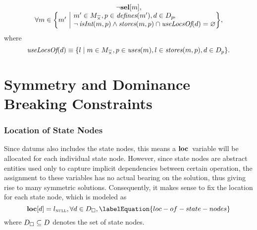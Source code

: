 \begin{equation}
  \begin{array}{c}
    \neg\mVar{sel}[m], \\
    \forall m \in
      \mSetBuilder*{m'}%
                   {%
                     \begin{array}{@{}l@{}}
                       m' \in \mKillMatchCompSet,
                       p \in \mDefines(m'),
                       d \in \mDataSet[p] \hspace{-1pt}, \\
                       \neg\mIsInt(m, p)
                       \mAnd
                       \mStores(m, p) \cap \mUseLocsOf(d) = \mEmptySet
                     \end{array}
                   } \!,
  \end{array}
\end{equation}
%
where
%
\begin{equation}
  \mUseLocsOf(d)
  \equiv
  \mSetBuilder{l}%
              {%
                m \in \mKillMatchCompSet,
                p \in \mUses(m),
                l \in \mStores(m, p),
                d \in \mDataSet[p]
              }.
\end{equation}


\section{Symmetry and Dominance Breaking Constraints}



\subsubsection{Location of State Nodes}

Since \glspl{datum} also includes the \glspl{state node}, this means a
$\mVar{loc}$~\gls{variable} will be allocated for each individual \gls{state
  node}.
%
However, since \glspl{state node} are abstract entities used only to capture
implicit dependencies between certain \gls{operation}, the assignment to these
\glspl{variable} has no actual bearing on the \gls{solution}, thus giving rise
to many symmetric \glspl{solution}.
%
Consequently, it makes sense to fix the location for each \gls{state node},
which is modeled as
%
\begin{equation}
  \mVar{loc}[d] = \mNullLocation,
  \forall d \in \mStateDataSet,
  \labelEquation{loc-of-state-nodes}
\end{equation}
%
where \mbox{$\mStateDataSet \subseteq \mDataSet$} denotes the set of
\glspl{state node}.


